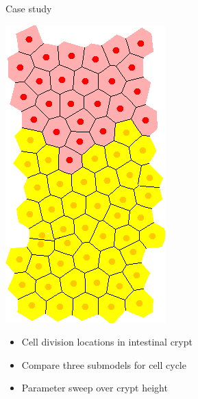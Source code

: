 \documentclass[t,xcolor={usenames,dvipsnames}]{beamer}
\begin{document}
\begin{frame}{Case study}
\centering
\begin{minipage}{0.4\textwidth}
\includegraphics[height=.8\textheight]{VariableWnt}
\end{minipage}
\begin{minipage}{0.5\textwidth}
\begin{itemize}
\item Cell division locations in intestinal crypt
\item Compare three submodels for cell cycle
\item Parameter sweep over crypt height
\end{itemize}
\end{minipage}
\end{frame}
\end{document}
